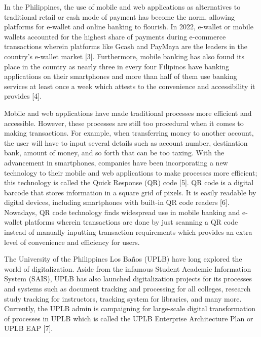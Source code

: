 \documentclass[journal]{./IEEE/IEEEtran}
\begin{document}
In the Philippines, the use of mobile and web applications as alternatives to traditional retail or cash mode of payment has become the norm, allowing platforms for e-wallet and online banking to flourish. In 2022, e-wallet or mobile wallets accounted for the highest share of payments during e-commerce transactions wherein platforms like Gcash and PayMaya are the leaders in the country's e-wallet market [3]. Furthermore, mobile banking has also found its place in the country as nearly three in every four Filipinos have banking applications on their smartphones and more than half of them use banking services at least once a week which attests to the convenience and accessibility it provides [4]. 

Mobile and web applications have made traditional processes more efficient and accessible. However, these processes are still too procedural when it comes to making transactions. For example, when transferring money to another account, the user will have to input several details such as account number, destination bank, amount of money, and so forth that can be too taxing. With the advancement in smartphones, companies have been incorporating a new technology to their mobile and web applications to make processes more efficient; this technology is called the Quick Response (QR) code [5]. QR code is a digital barcode that stores information in a square grid of pixels. It is easily readable by digital devices, including smartphones with built-in QR code readers [6]. Nowadays, QR code technology finds widespread use in mobile banking and e-wallet platforms wherein transactions are done by just scanning a QR code instead of manually inputting transaction requirements which provides an extra level of convenience and efficiency for users. 

The University of the Philippines Los Baños (UPLB) have long explored the world of digitalization. Aside from the infamous Student Academic Information System (SAIS), UPLB has also launched digitalization projects for its processes and systems such as document tracking and processing for all colleges, research study tracking for instructors, tracking system for libraries, and many more. Currently, the UPLB admin is campaigning for large-scale digital transformation of processes in UPLB which is called the UPLB Enterprise Architecture Plan or UPLB EAP [7]. 
\end{document}
